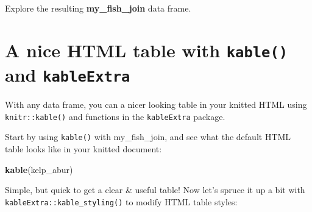 \documentclass[]{book}
\newenvironment{Shaded}{\begin{snugshade}}{\end{snugshade}}
\newcommand{\DataTypeTok}[1]{\textcolor[rgb]{0.13,0.29,0.53}{#1}}
\newcommand{\DecValTok}[1]{\textcolor[rgb]{0.00,0.00,0.81}{#1}}
\newcommand{\KeywordTok}[1]{\textcolor[rgb]{0.13,0.29,0.53}{\textbf{#1}}}
\newcommand{\NormalTok}[1]{#1}
\newcommand{\OperatorTok}[1]{\textcolor[rgb]{0.81,0.36,0.00}{\textbf{#1}}}
\newcommand{\OtherTok}[1]{\textcolor[rgb]{0.56,0.35,0.01}{#1}}
\newcommand{\StringTok}[1]{\textcolor[rgb]{0.31,0.60,0.02}{#1}}
\begin{document}
\begin{Shaded}
\end{Shaded}

Explore the resulting \textbf{my\_fish\_join} data frame.

\hypertarget{a-nice-html-table-with-kable-and-kableextra}{%
\section{\texorpdfstring{A nice HTML table with \texttt{kable()} and \texttt{kableExtra}}{A nice HTML table with kable() and kableExtra}}\label{a-nice-html-table-with-kable-and-kableextra}}

With any data frame, you can a nicer looking table in your knitted HTML using \texttt{knitr::kable()} and functions in the \texttt{kableExtra} package.

Start by using \texttt{kable()} with my\_fish\_join, and see what the default HTML table looks like in your knitted document:

\begin{Shaded}
\begin{Highlighting}[]
\KeywordTok{kable}\NormalTok{(kelp_abur)}
\end{Highlighting}
\end{Shaded}

Simple, but quick to get a clear \& useful table! Now let's spruce it up a bit with \texttt{kableExtra::kable\_styling()} to modify HTML table styles:

\begin{Shaded}
\end{Shaded}
\end{document}
